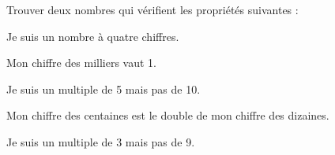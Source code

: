\documentclass[exercice]{thedocument}%
\begin{document}
%
Trouver deux nombres qui vérifient les propriétés suivantes :\par\medskip
{}\hskip10pt Je suis un nombre à quatre chiffres.\par\smallskip
{}\hskip10pt Mon chiffre des milliers vaut 1.\par\smallskip
{}\hskip10pt Je suis un multiple de 5 mais pas de 10.\par\smallskip
{}\hskip10pt Mon chiffre des centaines est le double de mon chiffre des dizaines.\par\smallskip
{}\hskip10pt Je suis un multiple de 3 mais pas de 9.
\end{document}
